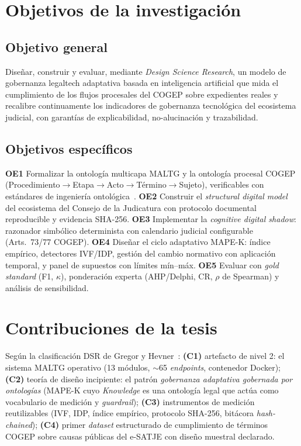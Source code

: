 \documentclass[a4paper,openany,12pt]{book}
\begin{document}
\section{Objetivos de la investigación}
\subsection{Objetivo general}
Diseñar, construir y evaluar, mediante \textit{Design Science Research}, un modelo de gobernanza legaltech adaptativa basada en inteligencia artificial que mida el cumplimiento de los flujos procesales del COGEP sobre expedientes reales y recalibre continuamente los indicadores de gobernanza tecnológica del ecosistema judicial, con garantías de explicabilidad, no-alucinación y trazabilidad.
\subsection{Objetivos específicos}
\textbf{OE1} Formalizar la ontología multicapa MALTG y la ontología procesal COGEP (Procedimiento$\to$Etapa$\to$Acto$\to$Término$\to$Sujeto), verificables con estándares de ingeniería ontológica~\cite{poveda2014,suarez2015}. \textbf{OE2} Construir el \textit{structural digital model} del ecosistema del Consejo de la Judicatura con protocolo documental reproducible y evidencia SHA-256. \textbf{OE3} Implementar la \textit{cognitive digital shadow}: razonador simbólico determinista con calendario judicial configurable (Arts.~73/77 COGEP). \textbf{OE4} Diseñar el ciclo adaptativo MAPE-K: índice empírico, detectores IVF/IDP, gestión del cambio normativo con aplicación temporal, y panel de supuestos con límites mín--máx. \textbf{OE5} Evaluar con \textit{gold standard} (F1, $\kappa$), ponderación experta (AHP/Delphi, CR, $\rho$ de Spearman) y análisis de sensibilidad.

\section{Contribuciones de la tesis}
Según la clasificación DSR de Gregor y Hevner~\cite{gregor2013}: \textbf{(C1)} artefacto de nivel 2: el sistema MALTG operativo (13 módulos, $\sim$65 \textit{endpoints}, contenedor Docker); \textbf{(C2)} teoría de diseño incipiente: el patrón \emph{gobernanza adaptativa gobernada por ontologías} (MAPE-K cuyo \textit{Knowledge} es una ontología legal que actúa como vocabulario de medición y \textit{guardrail}); \textbf{(C3)} instrumentos de medición reutilizables (IVF, IDP, índice empírico, protocolo SHA-256, bitácora \textit{hash-chained}); \textbf{(C4)} primer \textit{dataset} estructurado de cumplimiento de términos COGEP sobre causas públicas del e-SATJE con diseño muestral declarado.
\end{document}
